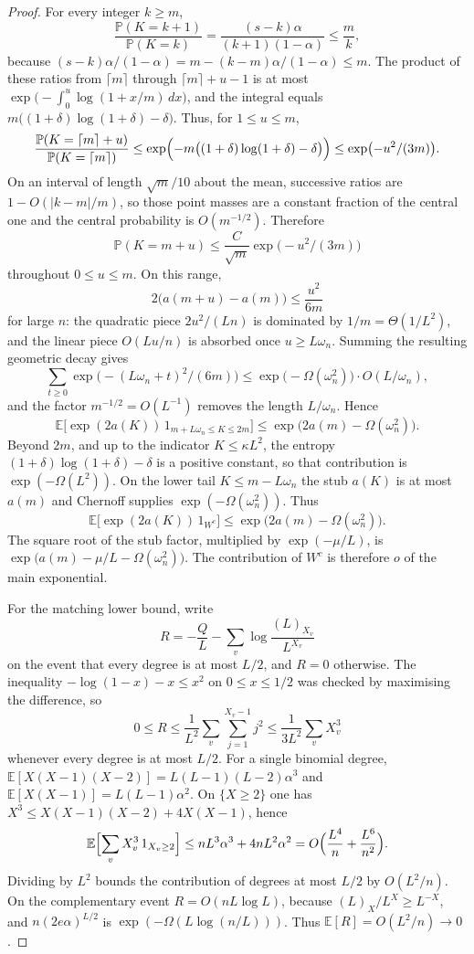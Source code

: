 \documentclass[11pt]{article}
\newcommand{\EE}{\mathbb{E}}
\newcommand{\PP}{\mathbb{P}}
\begin{document}
\begin{proof}
For every integer \(k\ge m\),
\[
\frac{\PP(K=k+1)}{\PP(K=k)}
=
\frac{(s-k)\alpha}{(k+1)(1-\alpha)}
\le
\frac{m}{k},
\]
because \((s-k)\alpha/(1-\alpha)=m-(k-m)\alpha/(1-\alpha)\le m\).
The product of these ratios from \(\lceil m\rceil\) through \(\lceil m\rceil+u-1\) is at most
\(\exp\bigl(-\int_0^u\log(1+x/m)\,dx\bigr)\), and the integral equals
\(m\bigl((1+\delta)\log(1+\delta)-\delta\bigr)\).
Thus, for \(1\le u\le m\),
\[
\frac{\PP(K=\lceil m\rceil+u)}{\PP(K=\lceil m\rceil)}
\le
\exp\Bigl(-m\bigl((1+\delta)\log(1+\delta)-\delta\bigr)\Bigr)
\le
\exp\bigl(-u^2/(3m)\bigr).
\]
On an interval of length \(\sqrt{m}/10\) about the mean, successive ratios are
\(1-O(|k-m|/m)\), so those point masses are a constant fraction of the central
one and the central probability is \(O(m^{-1/2})\). Therefore
\[
\PP(K=m+u)
\le
\frac{C}{\sqrt{m}}\exp\bigl(-u^2/(3m)\bigr)
\]
throughout \(0\le u\le m\). On this range,
\[
2\bigl(a(m+u)-a(m)\bigr)
\le
\frac{u^2}{6m}
\]
for large \(n\): the quadratic piece \(2u^2/(Ln)\) is dominated by \(1/m=\Theta(1/L^2)\),
and the linear piece \(O(Lu/n)\) is absorbed once \(u\ge L\omega_n\).
Summing the resulting geometric decay gives
\[
\sum_{t\ge 0}\exp\bigl(-(L\omega_n+t)^2/(6m)\bigr)
\le
\exp\bigl(-\Omega(\omega_n^2)\bigr)\cdot O(L/\omega_n),
\]
and the factor \(m^{-1/2}=O(L^{-1})\) removes the length \(L/\omega_n\). Hence
\[
\EE\bigl[\exp(2a(K))\,1_{m+L\omega_n\le K\le 2m}\bigr]
\le
\exp\bigl(2a(m)-\Omega(\omega_n^2)\bigr).
\]
Beyond \(2m\), and up to the indicator \(K\le\kappa L^2\), the entropy
\((1+\delta)\log(1+\delta)-\delta\) is a positive constant, so that contribution
is \(\exp(-\Omega(L^2))\). On the lower tail \(K\le m-L\omega_n\) the stub
\(a(K)\) is at most \(a(m)\) and Chernoff supplies \(\exp(-\Omega(\omega_n^2))\).
Thus
\[
\EE\bigl[\exp(2a(K))\,1_{W^c}\bigr]
\le
\exp\bigl(2a(m)-\Omega(\omega_n^2)\bigr).
\]
The square root of the stub factor, multiplied by \(\exp(-\mu/L)\), is
\(\exp\bigl(a(m)-\mu/L-\Omega(\omega_n^2)\bigr)\). The contribution of \(W^c\) is
therefore \(o\) of the main exponential.

For the matching lower bound, write
\[
R
=
-\frac{Q}{L}-\sum_v\log\frac{(L)_{X_v}}{L^{X_v}}
\]
on the event that every degree is at most \(L/2\), and \(R=0\) otherwise.
The inequality \(-\log(1-x)-x\le x^2\) on \(0\le x\le 1/2\) was checked by
maximising the difference, so
\[
0\le R
\le
\frac1{L^2}\sum_v\sum_{j=1}^{X_v-1} j^2
\le
\frac1{3L^2}\sum_v X_v^3
\]
whenever every degree is at most \(L/2\). For a single binomial degree,
\(\EE[X(X-1)(X-2)]=L(L-1)(L-2)\alpha^3\) and \(\EE[X(X-1)]=L(L-1)\alpha^2\).
On \(\{X\ge 2\}\) one has \(X^3\le X(X-1)(X-2)+4X(X-1)\), hence
\[
\EE\Bigl[\sum_v X_v^3\,1_{X_v\ge 2}\Bigr]
\le
nL^3\alpha^3+4nL^2\alpha^2
=
O\Bigl(\frac{L^4}{n}+\frac{L^6}{n^2}\Bigr).
\]
Dividing by \(L^2\) bounds the contribution of degrees at most \(L/2\) by
\(O(L^2/n)\). On the complementary event \(R=O(nL\log L)\), because
\((L)_X/L^X\ge L^{-X}\), and \(n(2e\alpha)^{L/2}\) is
\(\exp(-\Omega(L\log(n/L)))\). Thus \(\EE[R]=O(L^2/n)\to 0\).


\end{proof}
\end{document}
